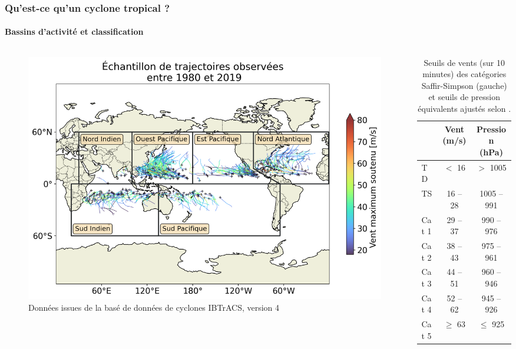 \documentclass[aspectratio=169, usepdftitle=false, xcolor={dvipsnames}, 9pt,table]{beamer}
\begin{document}
\begin{frame}[c]
    \frametitle{Qu'est-ce qu'un cyclone tropical ?}
    \framesubtitle{Bassins d'activité et classification}
    \begin{columns}
        \begin{column}{0.65\textwidth}
            \begin{figure}[h]
                \centering
                \includegraphics[width=\textwidth]{Figures/Bassins_et_trajectoires_soutenance.png}
                \caption{Données issues de la basé de données de cyclones IBTrACS, version 4}
            \end{figure}
        \end{column}
        \begin{column}{0.35\textwidth}
            \begin{table}[h]
                \centering
                \caption{Seuils de vents (sur 10 minutes) des catégories Saffir-Simpson (gauche) et seuils de pression équivalents ajustés
                selon \cite{klotzbach_surface_2020}.}
                \footnotesize
                \begin{tabular}{l|c|c}
                     & Vent (m/s) & Pression (hPa) \\
                    \hline
                    TD & $<$ 16 & $>$ 1005 \\
                    TS & 16 -- 28 & 1005 -- 991 \\
                    Cat 1 & 29 -- 37 & 990 -- 976 \\
                    Cat 2 & 38 -- 43 & 975 -- 961 \\
                    Cat 3 & 44 -- 51 & 960 -- 946 \\
                    Cat 4 & 52 --  62 & 945 -- 926\\
                    Cat 5 & $\geq$ 63 & $\leq$ 925
                \end{tabular}
            \end{table}
        \end{column}
    \end{columns}
\end{frame}
\end{document}
